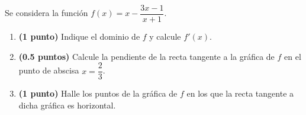 
Se considera la función $f(x)=x-\dfrac{3x-1}{x+1}$.
\begin{enumerate}[label=\alph*)]
  \item \textbf{(1 punto)} Indique el dominio de $f$ y calcule $f'(x)$.
  \item \textbf{(0.5 puntos)} Calcule la pendiente de la recta tangente a la
  gráfica de $f$ en el punto de abscisa $x=\dfrac{2}{3}$.
  \item \textbf{(1 punto)} Halle los puntos de la gráfica de $f$ en los que
  la recta tangente a dicha gráfica es horizontal.
\end{enumerate}
